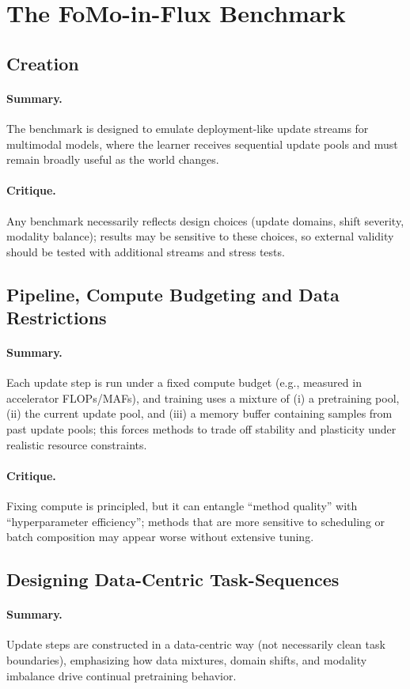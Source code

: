 \documentclass[12pt]{article}
\begin{document}
\section{The FoMo-in-Flux Benchmark}
\subsection{Creation}
\paragraph{Summary.} The benchmark is designed to emulate deployment-like update streams for multimodal
models, where the learner receives sequential update pools and must remain broadly useful as the world changes.
\paragraph{Critique.} Any benchmark necessarily reflects design choices (update domains, shift severity,
modality balance); results may be sensitive to these choices, so external validity should be tested with
additional streams and stress tests.

\subsection{Pipeline, Compute Budgeting and Data Restrictions}
\paragraph{Summary.} Each update step is run under a fixed compute budget (e.g., measured in accelerator
FLOPs/MAFs), and training uses a mixture of (i) a pretraining pool, (ii) the current update pool, and (iii) a
memory buffer containing samples from past update pools; this forces methods to trade off stability and
plasticity under realistic resource constraints.
\paragraph{Critique.} Fixing compute is principled, but it can entangle “method quality” with “hyperparameter
efficiency”; methods that are more sensitive to scheduling or batch composition may appear worse without
extensive tuning.

\subsection{Designing Data-Centric Task-Sequences}
\paragraph{Summary.} Update steps are constructed in a data-centric way (not necessarily clean task
boundaries), emphasizing how data mixtures, domain shifts, and modality imbalance drive continual pretraining behavior.
\end{document}
